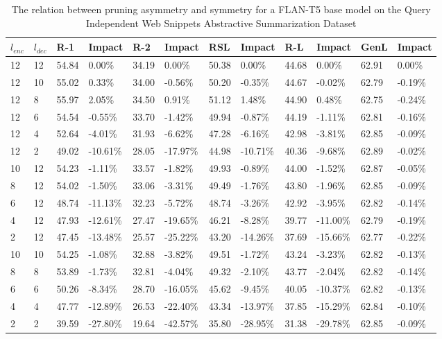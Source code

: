\begin{table*}[!ht]
    \centering
    \caption{The relation between pruning asymmetry and symmetry for a FLAN-T5 base model on the Query Independent Web Snippets Abstractive Summarization Dataset}
    \small
    \begin{tabular}{|l|l|l|l|l|l|l|l|l|l|l|l|}
    \hline
        $l_{enc}$ & $l_{dec}$ & R-1 & Impact & R-2 & Impact & RSL & Impact & R-L & Impact & GenL & Impact \\ \hline
        12 & 12 & 54.84 & 0.00\% & 34.19 & 0.00\% & 50.38 & 0.00\% & 44.68 & 0.00\% & 62.91 & 0.00\% \\ \hline
        12 & 10 & 55.02 & 0.33\% & 34.00 & -0.56\% & 50.20 & -0.35\% & 44.67 & -0.02\% & 62.79 & -0.19\% \\ \hline
        12 & 8 & 55.97 & 2.05\% & 34.50 & 0.91\% & 51.12 & 1.48\% & 44.90 & 0.48\% & 62.75 & -0.24\% \\ \hline
        12 & 6 & 54.54 & -0.55\% & 33.70 & -1.42\% & 49.94 & -0.87\% & 44.19 & -1.11\% & 62.81 & -0.16\% \\ \hline
        12 & 4 & 52.64 & -4.01\% & 31.93 & -6.62\% & 47.28 & -6.16\% & 42.98 & -3.81\% & 62.85 & -0.09\% \\ \hline
        12 & 2 & 49.02 & -10.61\% & 28.05 & -17.97\% & 44.98 & -10.71\% & 40.36 & -9.68\% & 62.89 & -0.02\% \\ \hline
        10 & 12 & 54.23 & -1.11\% & 33.57 & -1.82\% & 49.93 & -0.89\% & 44.00 & -1.52\% & 62.87 & -0.05\% \\ \hline
        8 & 12 & 54.02 & -1.50\% & 33.06 & -3.31\% & 49.49 & -1.76\% & 43.80 & -1.96\% & 62.85 & -0.09\% \\ \hline
        6 & 12 & 48.74 & -11.13\% & 32.23 & -5.72\% & 48.74 & -3.26\% & 42.92 & -3.95\% & 62.82 & -0.14\% \\ \hline
        4 & 12 & 47.93 & -12.61\% & 27.47 & -19.65\% & 46.21 & -8.28\% & 39.77 & -11.00\% & 62.79 & -0.19\% \\ \hline
        2 & 12 & 47.45 & -13.48\% & 25.57 & -25.22\% & 43.20 & -14.26\% & 37.69 & -15.66\% & 62.77 & -0.22\% \\ \hline
        10 & 10 & 54.25 & -1.08\% & 32.88 & -3.82\% & 49.51 & -1.72\% & 43.24 & -3.23\% & 62.82 & -0.13\% \\ \hline
        8 & 8 & 53.89 & -1.73\% & 32.81 & -4.04\% & 49.32 & -2.10\% & 43.77 & -2.04\% & 62.82 & -0.14\% \\ \hline
        6 & 6 & 50.26 & -8.34\% & 28.70 & -16.05\% & 45.62 & -9.45\% & 40.05 & -10.37\% & 62.82 & -0.13\% \\ \hline
        4 & 4 & 47.77 & -12.89\% & 26.53 & -22.40\% & 43.34 & -13.97\% & 37.85 & -15.29\% & 62.84 & -0.10\% \\ \hline
        2 & 2 & 39.59 & -27.80\% & 19.64 & -42.57\% & 35.80 & -28.95\% & 31.38 & -29.78\% & 62.85 & -0.09\% \\ \hline
    \end{tabular}
    \label{tab:asym-base-qiws}
\end{table*}
